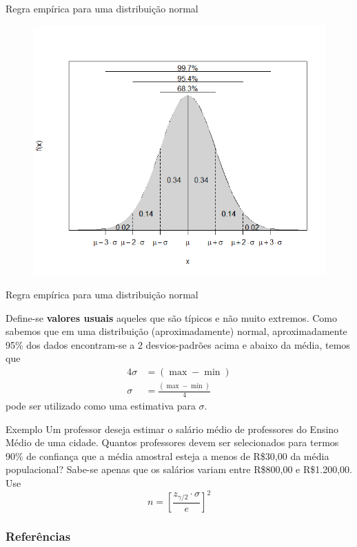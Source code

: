 \documentclass[14pt,aspectratio=1610]{beamer}
\begin{document}
\begin{frame}{Regra empírica para uma distribuição normal}
\begin{block}{}
\justifying
\begin{figure}
    \centering
    \includegraphics[scale=0.6]{figs/ICEmpirico.png}
\end{figure}
  
\end{block}
\end{frame}

\begin{frame}{Regra empírica para uma distribuição normal}
    \begin{block}{}
    \justifying
Define-se \textbf{valores usuais} aqueles que são típicos e não muito extremos. Como sabemos que em uma distribuição (aproximadamente) normal, aproximadamente 95\% dos dados encontram-se a 2 desvios-padrões acima e
abaixo da média, temos que
\begin{align*}
4\sigma &= (\max - \min) \\
\sigma &= \frac{(\max - \min)}{4}
\end{align*}
pode ser utilizado como uma estimativa para $\sigma$.  
\end{block}
\end{frame}

\begin{frame}{}
\begin{block}{Exemplo}
\justifying
Um professor deseja estimar o salário médio de professores do Ensino Médio de uma cidade. Quantos professores devem ser selecionados para termos 90\% de confiança que a média amostral esteja a menos de R\$30,00 da média populacional? Sabe-se apenas que os
salários variam entre R\$800,00 e R\$1.200,00. Use
$$
n = \left[ \frac{z_{\gamma/2} \cdot \sigma}{e} \right]^2
$$  
\nocite{Apostila}
\end{block}
\end{frame}

\begin{frame}%
\frametitle{\bf Referências}
\printbibliography
\end{frame}
\end{document}
